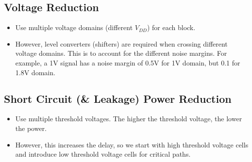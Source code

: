 \documentclass[11pt]{article}
\begin{document}
\subsection*{Voltage Reduction}
\begin{itemize}
    \item Use multiple voltage domains (different $V_{DD}$) for each block.
    \item However, level converters (shifters) are required when crossing different voltage domains. This is to account for the different noise margins. For example, a 1V signal has a noise margin of 0.5V for 1V domain, but 0.1 for 1.8V domain.
\end{itemize}
 
\subsection*{Short Circuit (\& Leakage) Power Reduction}
\begin{itemize}
    \item Use multiple threshold voltages. The higher the threshold voltage, the lower the power.
    \item However, this increases the delay, so we start with high threshold voltage cells and introduce low threshold voltage cells for critical paths.
\end{itemize}
\end{document}
